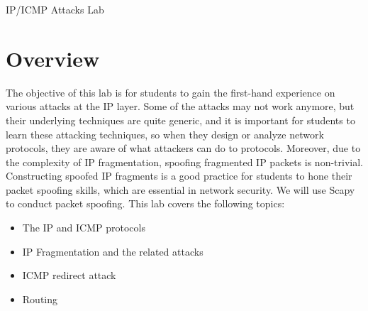 
\newcommand{\commonfolder}{../../common-files}





\newcommand{\ipFigs}{./Figs}






\begin{center}
{\LARGE IP/ICMP Attacks Lab}
\end{center}



\section{Overview}

The objective of this lab is for students to gain the first-hand experience 
on various attacks at the IP layer. Some of the attacks may not work anymore,
but their underlying techniques are quite generic, and it
is important for students to learn these attacking techniques, so when they design
or analyze network protocols, they are aware of what attackers can do to protocols.
Moreover, due to the complexity of IP fragmentation, spoofing fragmented IP packets
is non-trivial.  Constructing spoofed 
IP fragments is a good practice for students to hone their
packet spoofing skills, which are essential in network security.  
We will use Scapy to conduct packet spoofing.  
This lab covers the following topics:

\begin{itemize}[noitemsep]
\item The IP and ICMP protocols
\item IP Fragmentation and the related attacks
\item ICMP redirect attack
\item Routing 
\end{itemize}



